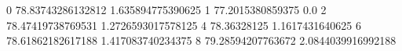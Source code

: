 0 78.83743286132812 1.635894775390625
1 77.2015380859375 0.0
2 78.47419738769531 1.2726593017578125
4 78.36328125 1.1617431640625
6 78.61862182617188 1.417083740234375
8 79.28594207763672 2.0844039916992188
